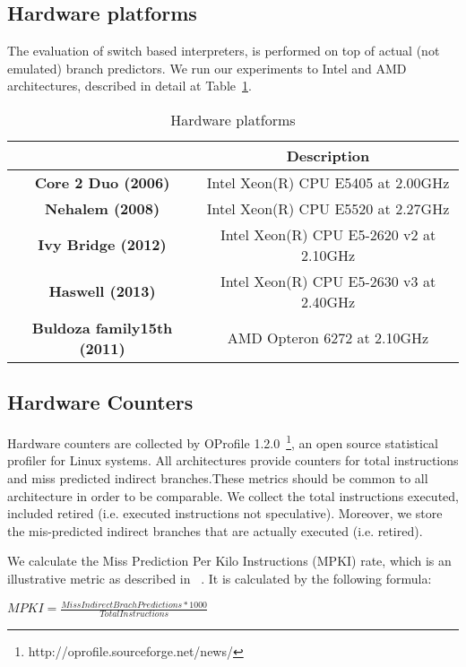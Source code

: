 \documentclass[parskip=full, paper=a4, fontsize=12pt]{scrartcl}
\numberwithin{equation}{section}
\numberwithin{figure}{section}
\numberwithin{table}{section}
\begin{document}
\subsection{Hardware platforms}
The evaluation of switch based interpreters, is performed on top of actual (not emulated) branch predictors. We run our experiments to Intel and AMD architectures, described in detail at Table~\ref{hw_p}.

\begin{table}[]
	\centering
	\caption{Hardware platforms}
	\label{hw_p}
	\begin{tabular}{|c|c|}
		\hline
		\textbf{}                   & \textbf{Description}                    \\ \hline
		\textbf{Core 2 Duo (2006)}  & Intel Xeon(R) CPU E5405 at 2.00GHz      \\ \hline
		\textbf{Nehalem (2008)}     & Intel Xeon(R) CPU E5520 at 2.27GHz      \\ \hline
		\textbf{Ivy Bridge (2012)}  & Intel Xeon(R) CPU E5-2620 v2 at 2.10GHz \\ \hline
		\textbf{Haswell (2013)}     & Intel Xeon(R) CPU E5-2630 v3 at 2.40GHz \\ \hline
		\textbf{Buldoza family15th (2011)} & AMD Opteron 6272 at 2.10GHz             \\ \hline
	\end{tabular}
\end{table}
\subsection{Hardware Counters}
Hardware counters are collected by OProfile 1.2.0~\footnote{http://oprofile.sourceforge.net/news/}, an open source
statistical profiler for Linux systems. All architectures provide counters
for total instructions and miss predicted indirect branches.These metrics should be common to all architecture in order to be comparable. We collect the total instructions executed, included retired (i.e. executed instructions not speculative). Moreover, we  
store the mis-predicted indirect branches that are actually executed (i.e. retired).

We calculate the Miss Prediction Per Kilo Instructions (MPKI) rate, which is an illustrative metric as described in ~\cite{performance_of_interpreters}. It is
calculated by the following formula:
\begin{center}
   $ MPKI = \frac{Miss Indirect Brach Predictions * 1000}{Total Instructions} $
\end{center}
\end{document}
